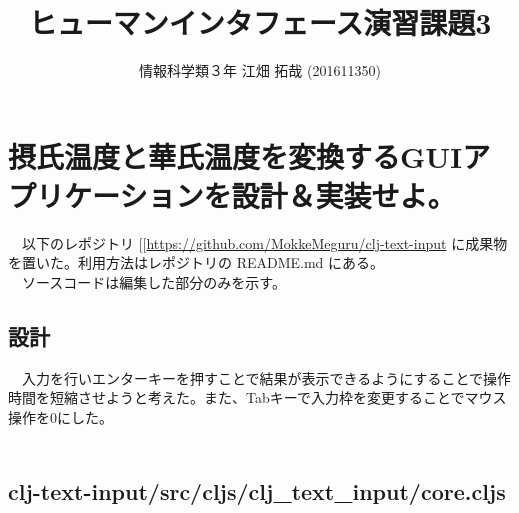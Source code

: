 \documentclass{scrartcl}
\author{情報科学類３年 江畑 拓哉 (201611350)}
\date{}
\title{ヒューマンインタフェース演習課題3}
\begin{document}
\maketitle
\tableofcontents

\section{摂氏温度と華氏温度を変換するGUIアプリケーションを設計＆実装せよ。}
\label{sec:org1b953a8}
　以下のレポジトリ [[\url{https://github.com/MokkeMeguru/clj-text-input} に成果物を置いた。利用方法はレポジトリの README.md にある。\\
　ソースコードは編集した部分のみを示す。\\
\subsection{設計}
\label{sec:org3b69e7c}
　入力を行いエンターキーを押すことで結果が表示できるようにすることで操作時間を短縮させようと考えた。また、Tabキーで入力枠を変更することでマウス操作を0にした。\\

\newpage\\
\subsection{clj-text-input/src/cljs/clj\_text\_input/core.cljs}
\label{sec:orgef27046}
\end{document}
